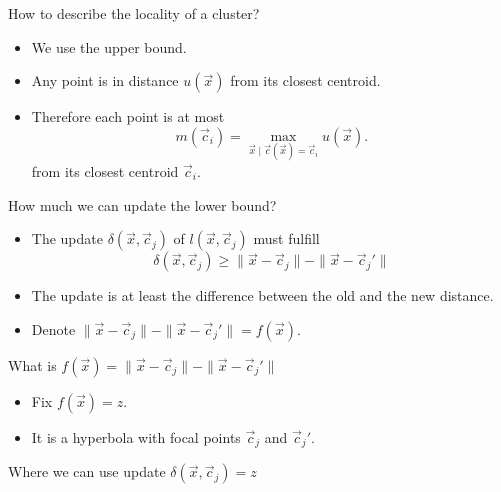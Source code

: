 \documentclass[10pt, compress]{beamer}
\newcommand{\x}{\vec{x}}
\newcommand{\cj}{\vec{c}_j}
\newcommand{\ci}{\vec{c}_i}
\newcommand{\ux}{u(\x)}
\newcommand{\lxcj}{l(\x, \cj)}
\newcommand{\distxcj}{\| \x - \cj \|}
\newcommand{\distxcjp}{\| \x - \cj' \|}
\newcommand{\deltaxcj}{\delta(\x, \cj)}
\newcommand{\mci}{m(\ci)}
\begin{document}
\begin{frame}{How to describe the locality of a cluster?}
  \vspace*{-0.5cm}
  \begin{itemize}
    \item We use the upper bound.
    \item Any point is in distance $\ux$ from its closest centroid.
    \item Therefore each point is at most
      \begin{equation*}
         \mci = \max_{\vec{x} \mid \vec{c}(\vec{x}) = \ci} u(\vec{x}).
      \end{equation*}
      from its closest centroid $\ci$.
  \end{itemize}
  \begin{center}
    
  \end{center}
\end{frame}

\begin{frame}{How much we can update the lower bound?}
  \begin{itemize}
     \item The update $\deltaxcj$ of $\lxcj$ must fulfill
       \begin{equation*}
         \deltaxcj \geq \distxcj - \distxcjp
       \end{equation*}
     \item The update is at least the difference between the old and the new distance.
     \item Denote $\distxcj - \distxcjp = f(\x)$.
  \end{itemize}
\end{frame}

\begin{frame}{What is $f(\x) = \distxcj - \distxcjp$}
  \begin{itemize}
    \item Fix $f(\x) = z$.
    \item It is a hyperbola with focal points $\cj$ and $\cj'$.
  \end{itemize}
  \begin{center}
    
  \end{center}
\end{frame}

\begin{frame}{Where we can use update $\deltaxcj = z$}
  \begin{center}
    
  \end{center}
\end{frame}
\end{document}
